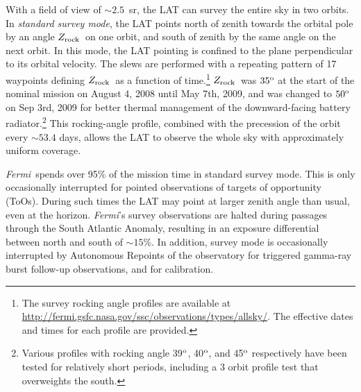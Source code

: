 \documentclass[aps,twocolumn,prd,superscriptaddress,showpacs,nofootinbib,fixfloat]{revtex4}
\newcommand{\Fermi}{{\slshape Fermi}}
\newcommand{\degree}{^{\rm o}}
\newcommand{\zrock}{$Z_{\rm rock}$}
\begin{document}



With a field of view of $\sim2.5$~sr, the LAT can survey the entire sky
in two orbits.  In \emph{standard survey mode}, the LAT points north of zenith
towards the orbital pole
by an angle \zrock\ on one orbit, and south of zenith by the same angle on the
next orbit.  In this mode, the LAT pointing is confined to the plane
perpendicular to its orbital velocity.  The slews are
performed with a repeating pattern of 17 waypoints defining
\zrock\ as a function of time.\footnote{The 
survey rocking angle profiles are available at
\url{http://fermi.gsfc.nasa.gov/ssc/observations/types/allsky/}.
The effective dates and times for each profile are provided.
} \zrock\ was $35\degree$ at the start of the nominal
mission on August 4, 2008 until May 7th, 2009, and was changed
to $50\degree$ on Sep 3rd, 2009 for better thermal
management of the downward-facing battery
radiator.\footnote{Various profiles
with rocking angle 39$\degree$, 40$\degree$, and 45$\degree$
respectively have been tested for relatively short periods,
including a 3 orbit profile test that overweights the south.} 
This rocking-angle profile, combined with the precession
of the orbit every $\sim53.4$ days, allows the LAT to observe
the whole sky with approximately uniform coverage.

\Fermi\ spends over 95\% of the mission time in standard survey mode.
This is only occasionally interrupted for
pointed observations of targets of opportunity (ToOs).  During such times
the LAT may point at larger zenith angle than usual, even at the horizon.
\Fermi's survey observations are
halted during passages through the South
Atlantic Anomaly, resulting in an exposure
differential between north and south of $\sim15$\%. In addition,
survey mode is occasionally interrupted by Autonomous
Repoints of the observatory for triggered
gamma-ray burst follow-up observations, and for calibration.
\medskip
\end{document}
